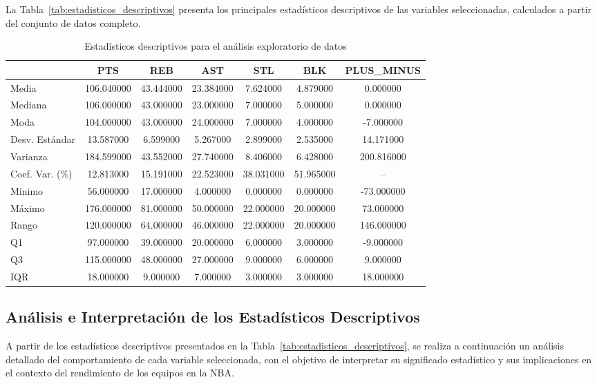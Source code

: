 \documentclass[12pt]{article}
\begin{document}
La Tabla~\ref{tab:estadisticos_descriptivos} presenta los principales estadísticos descriptivos
de las variables seleccionadas, calculados a partir del conjunto de datos completo.


\begin{table}[H]
\caption{Estadísticos descriptivos para el análisis exploratorio de datos}
\label{tab:estadisticos_descriptivos_eda}
\begin{tabular}{|l|c|c|c|c|c|c|}
\toprule
 & PTS & REB & AST & STL & BLK & PLUS\_MINUS \\
\midrule
Media & 106.040000 & 43.444000 & 23.384000 & 7.624000 & 4.879000 & 0.000000 \\
Mediana & 106.000000 & 43.000000 & 23.000000 & 7.000000 & 5.000000 & 0.000000 \\
Moda & 104.000000 & 43.000000 & 24.000000 & 7.000000 & 4.000000 & -7.000000 \\
Desv. Estándar & 13.587000 & 6.599000 & 5.267000 & 2.899000 & 2.535000 & 14.171000 \\
Varianza & 184.599000 & 43.552000 & 27.740000 & 8.406000 & 6.428000 & 200.816000 \\
Coef. Var. (\%) & 12.813000 & 15.191000 & 22.523000 & 38.031000 & 51.965000 & -- \\
Mínimo & 56.000000 & 17.000000 & 4.000000 & 0.000000 & 0.000000 & -73.000000 \\
Máximo & 176.000000 & 81.000000 & 50.000000 & 22.000000 & 20.000000 & 73.000000 \\
Rango & 120.000000 & 64.000000 & 46.000000 & 22.000000 & 20.000000 & 146.000000 \\
Q1 & 97.000000 & 39.000000 & 20.000000 & 6.000000 & 3.000000 & -9.000000 \\
Q3 & 115.000000 & 48.000000 & 27.000000 & 9.000000 & 6.000000 & 9.000000 \\
IQR & 18.000000 & 9.000000 & 7.000000 & 3.000000 & 3.000000 & 18.000000 \\
\bottomrule
\end{tabular}
\end{table}



\subsection{Análisis e Interpretación de los Estadísticos Descriptivos}
\label{subsec:analisis-estadisticos}

A partir de los estadísticos descriptivos presentados en la Tabla~\ref{tab:estadisticos_descriptivos},
se realiza a continuación un análisis detallado del comportamiento de cada variable seleccionada,
con el objetivo de interpretar su significado estadístico y sus implicaciones en el contexto del
rendimiento de los equipos en la NBA.
\end{document}
